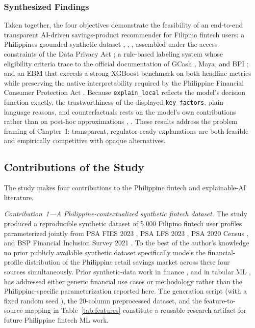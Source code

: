 \documentclass[journal]{./IEEE/IEEEtran}
\begin{document}
\subsubsection{Synthesized Findings}

Taken together, the four objectives demonstrate the feasibility of an end-to-end transparent AI-driven savings-product recommender for Filipino fintech users: a Philippines-grounded synthetic dataset \cite{ref35}, \cite{ref39}, \cite{ref40}, \cite{ref41} assembled under the access constraints of the Data Privacy Act \cite{ref45}; a rule-based labeling system whose eligibility criteria trace to the official documentation of GCash \cite{ref6}, Maya, and BPI \cite{ref37}; and an EBM that exceeds a strong XGBoost benchmark on both headline metrics while preserving the native interpretability required by the Philippine Financial Consumer Protection Act \cite{ref44}. Because \texttt{explain\_local} reflects the model's decision function exactly, the trustworthiness of the displayed \texttt{key\_factors}, plain-language reasons, and counterfactuals rests on the model's own contributions rather than on post-hoc approximations \cite{ref15}, \cite{ref48}. These results address the problem framing of Chapter~I: transparent, regulator-ready explanations are both feasible and empirically competitive with opaque alternatives.


\subsection{Contributions of the Study}

The study makes four contributions to the Philippine fintech and explainable-AI literature.

\textit{Contribution~1---A Philippine-contextualized synthetic fintech dataset.} The study produced a reproducible synthetic dataset of 5{,}000 Filipino fintech user profiles parameterized jointly from PSA FIES 2023 \cite{ref40}, PSA LFS 2023 \cite{ref41}, PSA 2020 Census \cite{ref39}, and BSP Financial Inclusion Survey 2021 \cite{ref35}. To the best of the author's knowledge no prior publicly available synthetic dataset specifically models the financial-profile distribution of the Philippine retail savings market across these four sources simultaneously. Prior synthetic-data work in finance \cite{ref46}, \cite{ref83} and in tabular ML \cite{ref29}, \cite{ref34} has addressed either generic financial use cases or methodology rather than the Philippine-specific parameterization reported here. The generation script (with a fixed random seed \cite{ref60}), the 20-column preprocessed dataset, and the feature-to-source mapping in Table~\ref{tab:features} constitute a reusable research artifact for future Philippine fintech ML work.
\end{document}
